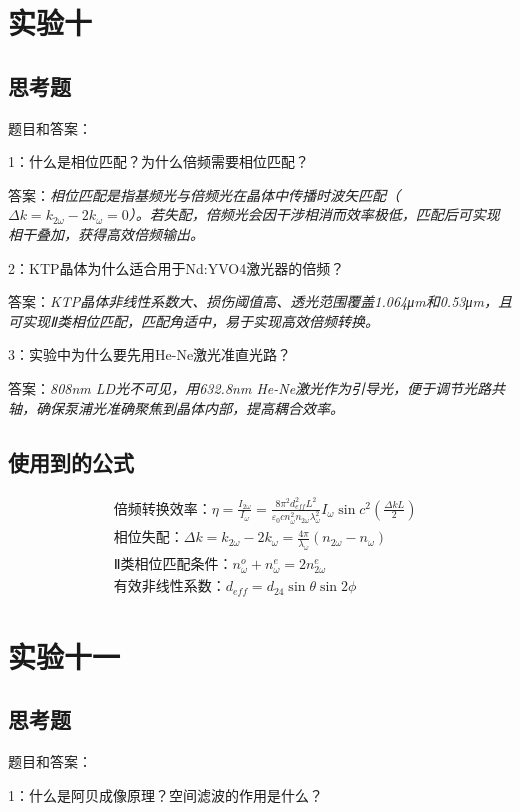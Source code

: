 \documentclass[10pt,journal,compsoc]{IEEEtran}
\begin{document}
\section{实验十}
\subsection{思考题}
题目和答案：

1：什么是相位匹配？为什么倍频需要相位匹配？

答案：\textit{相位匹配是指基频光与倍频光在晶体中传播时波矢匹配（$\Delta k = k_{2\omega} - 2k_{\omega} = 0$）。若失配，倍频光会因干涉相消而效率极低，匹配后可实现相干叠加，获得高效倍频输出。}

2：KTP晶体为什么适合用于Nd:YVO4激光器的倍频？

答案：\textit{KTP晶体非线性系数大、损伤阈值高、透光范围覆盖1.064μm和0.53μm，且可实现Ⅱ类相位匹配，匹配角适中，易于实现高效倍频转换。}

3：实验中为什么要先用He-Ne激光准直光路？

答案：\textit{808nm LD光不可见，用632.8nm He-Ne激光作为引导光，便于调节光路共轴，确保泵浦光准确聚焦到晶体内部，提高耦合效率。}

\subsection{使用到的公式}
\begin{align*}
&\text{倍频转换效率：}\eta = \frac{I_{2\omega}}{I_{\omega}} = \frac{8\pi^2 d_{eff}^2 L^2}{\varepsilon_0 c n_{\omega}^2 n_{2\omega} \lambda_{\omega}^2} I_{\omega} \sin c^2\left( \frac{\Delta k L}{2} \right) \\
&\text{相位失配：}\Delta k = k_{2\omega} - 2k_{\omega} = \frac{4\pi}{\lambda_{\omega}} (n_{2\omega} - n_{\omega}) \\
&\text{Ⅱ类相位匹配条件：}n_{\omega}^o + n_{\omega}^e = 2n_{2\omega}^e \\
&\text{有效非线性系数：}d_{eff} = d_{24} \sin\theta \sin 2\phi
\end{align*}

\section{实验十一}
\subsection{思考题}
题目和答案：

1：什么是阿贝成像原理？空间滤波的作用是什么？
\end{document}
